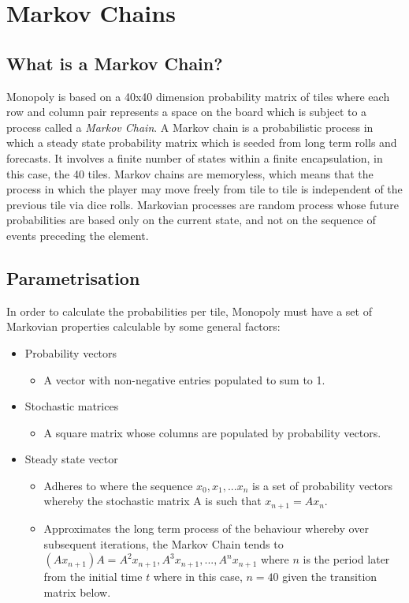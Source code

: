 \documentclass[12pt]{article}
\begin{document}
\section{Markov Chains}
\subsection{What is a Markov Chain?}
Monopoly is based on a 40x40 dimension probability matrix of tiles where each row and column pair represents a space on the board which is subject to a process called a \emph{Markov Chain}. A Markov chain is a probabilistic process in which a steady state probability matrix which is seeded from long term rolls and forecasts. It involves a finite number of states within a finite encapsulation, in this case, the 40 tiles. Markov chains are memoryless, which means that the process in which the player may move freely from tile to tile is independent of the previous tile via dice rolls. Markovian processes are random process whose future probabilities are based only on the current state, and not on the sequence of events preceding the element.

\subsection{Parametrisation}
In order to calculate the probabilities per tile, Monopoly must have a set of Markovian properties calculable by some general factors:
\begin{itemize}
\item Probability vectors
\begin{itemize}
\item A vector with non-negative entries populated to sum to 1.
\end{itemize}
\item Stochastic matrices
\begin{itemize}
\item A square matrix whose columns are populated by probability vectors.
\end{itemize}
\item Steady state vector
\begin{itemize}
\item Adheres to where the sequence $x_0,x_1,...x_n$ is a set of probability vectors whereby the stochastic matrix A is such that $x_{n+1}=Ax_{n}$.
\item Approximates the long term process of the behaviour whereby over subsequent iterations, the Markov Chain tends to $(Ax_{n+1})A=A^2x_{n+1},A^3x_{n+1},...,A^nx_{n+1}$ where $n$ is the period later from the initial time $t$ where in this case, $n=40$ given the transition matrix below.
\end{itemize}
\end{itemize}
\end{document}
